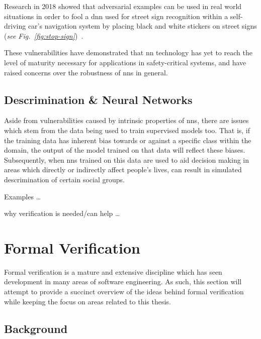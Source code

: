 Research in 2018 showed that adversarial examples can be 
used in real world situations in order to fool a \gls{dnn} used for street sign 
recognition within a self-driving car's navigation system by placing black and white stickers
on street signs (\textit{see Fig.~\ref{fig:stop-sign}})~\citep{eykholt2018}.

These vulnerabilities have demonstrated that \gls{nn} technology has yet to reach the level of
maturity necessary for applications in safety-critical systems, and have raised
concerns over the robustness of \glspl{nn} in general.


\subsection{Descrimination \& Neural Networks}

Aside from vulnerabilities caused by intrinsic properties of \glspl{nn}, there are
issues which stem from the data being used to train supervised models too. That is,
if the training data has inherent bias towards or against a specific class within the domain, the output 
of the model trained on that data will reflect these biases. Subsequently, when \glspl{nn} trained on this data are
used to aid decision making in areas which directly or indirectly affect people's lives, can
result in simulated descrimination of certain social groups.

Examples \ldots

why verification is needed/can help \ldots



%


\section{Formal Verification}

Formal verification is a mature and extensive discipline which has seen development in many areas 
of software engineering. As such, this section will attempt to provide a succinct 
overview of the ideas behind formal verification while keeping the focus on areas
related to this thesis.

\subsection{Background}


